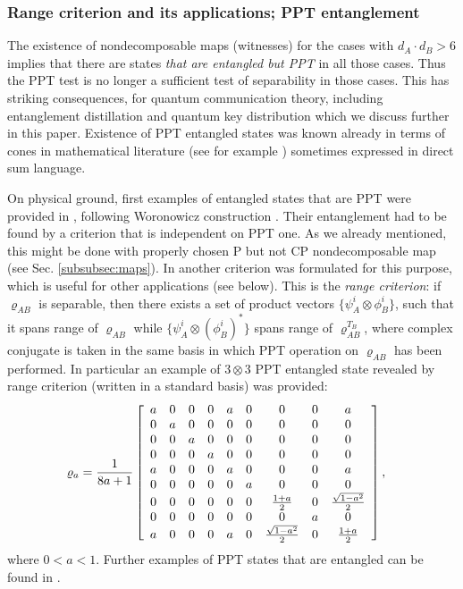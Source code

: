 \documentclass[twocolumn,aps,rmp]{revtex4}
\begin{document}
\subsubsection{Range criterion and its applications; PPT entanglement
\label{subsubsec:RangePPT}}

The existence of nondecomposable maps (witnesses) for the cases with
$d_{A}\cdot d_{B}>6$ implies that there are states {\it that are
  entangled but PPT} in all those cases. Thus the PPT test is no
longer a sufficient test of separability in those cases. This has
striking consequences, for quantum communication theory, including
entanglement distillation and quantum key distribution which we
discuss further in this paper. Existence of PPT entangled states was
known already in terms of cones in mathematical literature (see for
example \cite{Choi82}) sometimes expressed in direct sum language.

On physical ground, first examples of entangled states that are PPT
were provided in \cite{Pawel97}, following Woronowicz construction
\cite{Woronowicz}. Their entanglement had to be found by a criterion
that is independent on PPT one. As we already mentioned, this might be
done with properly chosen P but not CP nondecomposable map (see
Sec. \ref{subsubsec:maps}). In \cite{Pawel97} another criterion was
formulated for this purpose, which is useful for other applications
(see below). This is the {\it range criterion}: if $\varrho_{AB}$ is
separable, then there exists a set of product vectors $\{ \psi_{A}^{i}
\otimes \phi_{B}^{i}\} $, such that it spans range of $\varrho_{AB}$
while $\{ \psi_{A}^{i} \otimes (\phi_{B}^{i})^{*}\}$ spans range of
$\varrho_{AB}^{T_{B}}$, where complex conjugate is taken in the same
basis in which PPT operation on $\varrho_{AB}$ has been performed. In
particular an example of $3 \otimes 3$ PPT entangled state revealed by
range criterion (written in a standard basis) was provided:
\begin{eqnarray}
\varrho_{a}={1 \over 8a + 1}
\left[ \begin{array}{ccccccccc}
     a &0&0&0&a&0&0&0& a   \\
      0&a&0&0&0&0&0&0&0     \\
      0&0&a&0&0&0&0&0&0     \\
      0&0&0&a&0&0&0&0&0     \\
     a &0&0&0&a&0&0&0& a     \\
      0&0&0&0&0&a&0&0&0     \\
0&0&0&0&0&0&{1+a \over 2}&0&{\sqrt{1-a^2} \over 2}\\
      0&0&0&0&0&0&0&a&0     \\
     a &0&0&0&a&0&{\sqrt{1-a^2} \over 2}&0&{1+a \over 2}\\
      \end{array}
    \right ], \ \ \
\label{tran}
\end{eqnarray}
where $0 < a < 1$. Further examples of PPT states that are entangled
can be found in \cite{Alber2001}.
\end{document}
